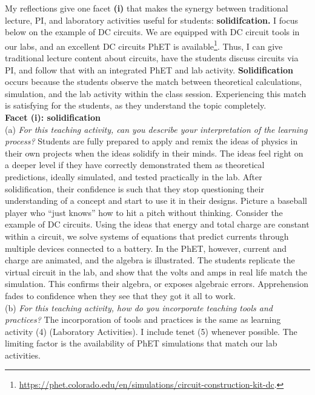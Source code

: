 \documentclass[../../../main.tex]{subfiles}
\begin{document}
My reflections give one facet \textbf{(i)} that makes the synergy between traditional lecture, PI, and laboratory activities useful for students: \textbf{solidifcation.}  I focus below on the example of DC circuits.  We are equipped with DC circuit tools in our labs, and an excellent DC circuits PhET is available\footnote{\url{https://phet.colorado.edu/en/simulations/circuit-construction-kit-dc}.}.  Thus, I can give traditional lecture content about circuits, have the students discuss circuits via PI, and follow that with an integrated PhET and lab activity.  \textbf{Solidification} occurs because the students observe the match between theoretical calculations, simulation, and the lab activity within the class session.  Experiencing this match is satisfying for the students, as they understand the topic completely.
\\
\vspace{0.25cm}
\textbf{Facet (i): solidification}
\\
\vspace{0.25cm}
(a) \textit{For this teaching activity, can you describe your interpretation of the learning process?}  Students are fully prepared to apply and remix the ideas of physics in their own projects when the ideas solidify in their minds.  The ideas feel right on a deeper level if they have correctly demonstrated them as theoretical predictions, ideally simulated, and tested practically in the lab.  After solidification, their confidence is such that they stop questioning their understanding of a concept and start to use it in their designs.  Picture a baseball player who ``just knows'' how to hit a pitch without thinking.  Consider the example of DC circuits.  Using the ideas that energy and total charge are constant within a circuit, we solve systems of equations that predict currents through multiple devices connected to a battery.  In the PhET, however, current and charge are animated, and the algebra is illustrated.  The students replicate the virtual circuit in the lab, and show that the volts and amps in real life match the simulation.  This confirms their algebra, or exposes algebraic errors.  Apprehension fades to confidence when they see that they got it all to work.
\\
\vspace{0.25cm}
(b) \textit{For this teaching activity, how do you incorporate teaching tools and practices?}  The incorporation of tools and practices is the same as learning activity (4) (Laboratory Activities).  I include tenet (5) whenever possible.  The limiting factor is the availability of PhET simulations that match our lab activities.
\end{document}
